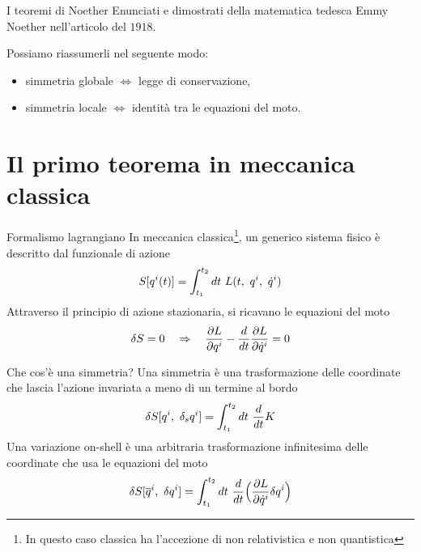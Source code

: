 

\begin{frame}
    \titlepage
\end{frame}


\begin{frame}{I teoremi di Noether}
    Enunciati e dimostrati della matematica tedesca Emmy Noether nell'articolo del $1918$. 

    \hfill

      Possiamo riassumerli nel seguente modo:
    \begin{itemize}
        \item simmetria globale $\iff$ legge di conservazione,
        \item simmetria locale $\iff$ identità tra le equazioni del moto.
    \end{itemize}
\end{frame}

\section{Il primo teorema in meccanica classica}

\begin{frame}{Formalismo lagrangiano}
    In meccanica classica\footnote{In questo caso classica ha l'accezione di non relativistica e non quantistica}, un generico sistema fisico è descritto dal funzionale di azione
    \begin{equation*}
         S[q^i(t)] = \int_{t_1}^{t_2}dt~ L(t, ~q^i, ~\dot q^i)
    \end{equation*} 
      Attraverso il principio di azione stazionaria, si ricavano le equazioni del moto
    \begin{equation*}
        \delta S = 0 \quad \Rightarrow \quad \frac{\partial L}{\partial q^i} - \frac{d}{dt} \frac{\partial L}{\partial\dot q^i} = 0
    \end{equation*}
\end{frame}

\begin{frame}{Che cos'è una simmetria?}
    Una simmetria è una trasformazione delle coordinate che lascia l'azione invariata a meno di un termine al bordo
    \begin{equation*}
        \delta S[q^i, ~\delta_s q^i] = \int_{t_1}^{t_2}dt~ \frac{d}{dt} K
    \end{equation*}
    Una variazione on-shell è una arbitraria trasformazione infinitesima delle coordinate che usa le equazioni del moto
    \begin{equation*}
        \delta S[\overline q^i, ~\delta q^i] = \int_{t_1}^{t_2}dt~ \frac{d}{dt} \Big( \frac{\partial L}{\partial\dot q^i} \delta q^i \Big )
    \end{equation*}
\end{frame}

